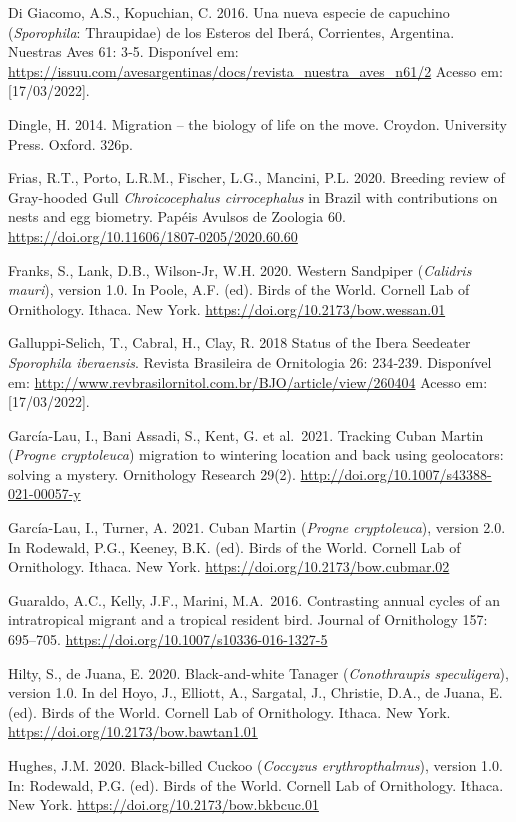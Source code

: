 \documentclass[
  oneside]{scrbook}
\begin{document}
Di Giacomo, A.S., Kopuchian, C. 2016. Una nueva especie de capuchino (\emph{Sporophila}: Thraupidae) de los Esteros del Iberá, Corrientes, Argentina. Nuestras Aves 61: 3‑5. Disponível em: \url{https://issuu.com/avesargentinas/docs/revista_nuestra_aves_n61/2} Acesso em: {[}17/03/2022{]}.

Dingle, H. 2014. Migration -- the biology of life on the move. Croydon. University Press. Oxford. 326p.

Frias, R.T., Porto, L.R.M., Fischer, L.G., Mancini, P.L. 2020. Breeding review of Gray-hooded Gull \emph{Chroicocephalus cirrocephalus} in Brazil with contributions on nests and egg biometry. Papéis Avulsos de Zoologia 60. \url{https://doi.org/10.11606/1807-0205/2020.60.60}

Franks, S., Lank, D.B., Wilson-Jr, W.H. 2020. Western Sandpiper (\emph{Calidris mauri}), version 1.0. In Poole, A.F. (ed). Birds of the World. Cornell Lab of Ornithology. Ithaca. New York. \url{https://doi.org/10.2173/bow.wessan.01}

Galluppi-Selich, T., Cabral, H., Clay, R. 2018 Status of the Ibera Seedeater \emph{Sporophila iberaensis}. Revista Brasileira de Ornitologia 26: 234‑239. Disponível em: \url{http://www.revbrasilornitol.com.br/BJO/article/view/260404} Acesso em: {[}17/03/2022{]}.

García-Lau, I., Bani Assadi, S., Kent, G. et al.~2021. Tracking Cuban Martin (\emph{Progne cryptoleuca}) migration to wintering location and back using geolocators: solving a mystery. Ornithology Research 29(2). \url{http://doi.org/10.1007/s43388-021-00057-y}

García-Lau, I., Turner, A. 2021. Cuban Martin (\emph{Progne cryptoleuca}), version 2.0. In Rodewald, P.G., Keeney, B.K. (ed). Birds of the World. Cornell Lab of Ornithology. Ithaca. New York. \url{https://doi.org/10.2173/bow.cubmar.02}

Guaraldo, A.C., Kelly, J.F., Marini, M.A.~2016. Contrasting annual cycles of an intratropical migrant and a tropical resident bird. Journal of Ornithology 157: 695--705. \url{https://doi.org/10.1007/s10336-016-1327-5}

Hilty, S., de Juana, E. 2020. Black-and-white Tanager (\emph{Conothraupis speculigera}), version 1.0. In del Hoyo, J., Elliott, A., Sargatal, J., Christie, D.A., de Juana, E. (ed). Birds of the World. Cornell Lab of Ornithology. Ithaca. New York. \url{https://doi.org/10.2173/bow.bawtan1.01}

Hughes, J.M. 2020. Black-billed Cuckoo (\emph{Coccyzus erythropthalmus}), version 1.0. In: Rodewald, P.G. (ed). Birds of the World. Cornell Lab of Ornithology. Ithaca. New York. \url{https://doi.org/10.2173/bow.bkbcuc.01}
\end{document}
